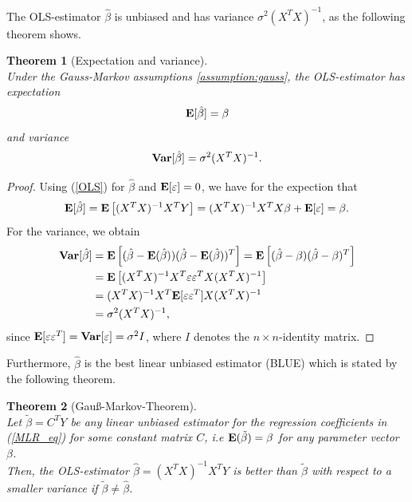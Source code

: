 \documentclass[a4paper, 11pt]{scrreprt}
\newtheorem{Theorem}{Theorem}[chapter]
\newcommand{\ew}{\mbox{\textbf{E}}}
\newcommand{\var}{\mbox{\textbf{Var}}}
\begin{document}
The OLS-estimator $\hat{\beta}$ is unbiased and has variance $\sigma^2 (X^T X)^{-1}$, as the following theorem shows.

\begin{Theorem}[Expectation and variance] \upshape $\text{ }$ \\
Under the Gauss-Markov assumptions \ref{assumption:gauss}, the OLS-estimator has expectation
\begin{equation}\label{OLS:unbiased}
\ew[\hat{\beta}] = \beta
\end{equation}
and variance
\begin{equation}\label{OLS:variance}
\var[\hat{\beta}] = \sigma^2 (X^T X)^{-1}.
\end{equation}
\end{Theorem}
\begin{proof}
Using (\ref{OLS}) for $\hat{\beta}$ and $\ew[\varepsilon]=0$, we have for the expection that
\begin{equation*}
\ew[\hat{\beta}] = \ew \left[(X^T X)^{-1} X^T Y \right] = (X^T X)^{-1} X^T X \beta + \ew[\varepsilon] = \beta.
\end{equation*}
For the variance, we obtain
\begin{align*}
\var[\hat{\beta}] &= \ew \left[ (\hat{\beta} - \ew(\hat{\beta}))(\hat{\beta} - \ew(\hat{\beta}))^T \right] = \ew \left[ (\hat{\beta} - \beta)(\hat{\beta} - \beta)^T \right]  \\
&= \ew \left[ (X^T X)^{-1} X^T \varepsilon \varepsilon^T X (X^T X) ^{-1} \right]  \\
&= (X^T X)^{-1} X^T \ew[\varepsilon \varepsilon^T] X (X^T X) ^{-1}   \\
&= \sigma^2 (X^T X)^{-1},
\end{align*}
since $\ew[\varepsilon \varepsilon^T] = \var[\varepsilon] = \sigma^2 I$, where $I$ denotes the $n \times n$-identity matrix.
\end{proof}
Furthermore, $\hat{\beta}$ is the best linear unbiased estimator (BLUE) which is stated by the following theorem.

\begin{Theorem}[Gauß-Markov-Theorem] \label{gaussmarkov} $\text{ }$ \\ \upshape
Let $\tilde{\beta} = C^T Y$ be any linear unbiased estimator for the regression coefficients in (\ref{MLR_eq}) for some constant matrix $C$, i.e $\ew(\tilde{\beta}) = \beta$ for any parameter vector $\beta$. \\
Then, the OLS-estimator $\hat{\beta} = (X^T X)^{-1} X^T Y$ is better than $\tilde{\beta}$ with respect to a smaller variance if $\tilde{\beta} \neq \hat{\beta}$.
\end{Theorem}
\end{document}
